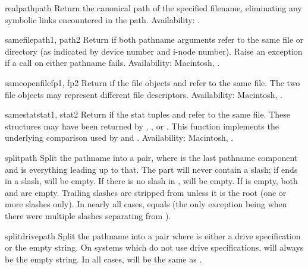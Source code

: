 \begin{funcdesc}{realpath}{path}
Return the canonical path of the specified filename, eliminating any
symbolic links encountered in the path.
Availability:  \UNIX.
\end{funcdesc}

\begin{funcdesc}{samefile}{path1, path2}
Return  if both pathname arguments refer to the same file or
directory (as indicated by device number and i-node number).
Raise an exception if a  call on either pathname
fails.
Availability:  Macintosh, \UNIX.
\end{funcdesc}

\begin{funcdesc}{sameopenfile}{fp1, fp2}
Return  if the file objects  and  refer to the
same file.  The two file objects may represent different file
descriptors.
Availability:  Macintosh, \UNIX.
\end{funcdesc}

\begin{funcdesc}{samestat}{stat1, stat2}
Return  if the stat tuples  and  refer to
the same file.  These structures may have been returned by
, , or .  This
function implements the underlying comparison used by
 and .
Availability:  Macintosh, \UNIX.
\end{funcdesc}

\begin{funcdesc}{split}{path}
Split the pathname  into a pair,  where  is the last pathname component and
 is everything leading up to that.  The  part will
never contain a slash; if  ends in a slash,  will
be empty.  If there is no slash in ,  will be
empty.  If  is empty, both  and  are
empty.  Trailing slashes are stripped from  unless it is the
root (one or more slashes only).  In nearly all cases,
 equals  (the only
exception being when there were multiple slashes separating 
from ).
\end{funcdesc}

\begin{funcdesc}{splitdrive}{path}
Split the pathname  into a pair  where  is either a drive specification or the
empty string.  On systems which do not use drive specifications,
 will always be the empty string.  In all cases,
 will be the same as .
\end{funcdesc}

